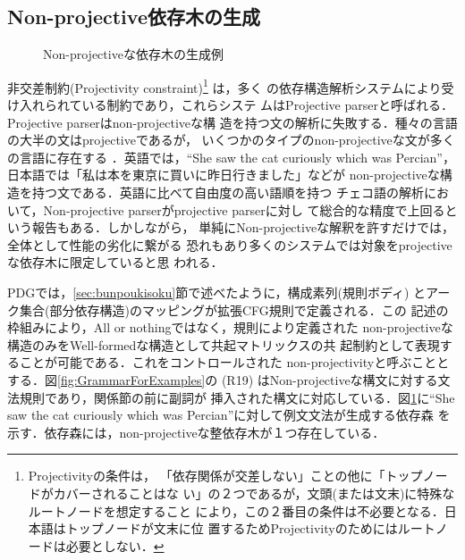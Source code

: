\begin{comment}
   ・アプリケーションにも依存する(弁別の必要がないアプリケーションもある)
  　 大規模な英語文法では，conjoined structureのみにスコープノードで対
　　 応するだけで実用上ほぼ問題なく実現できている．

・このヘッドワード修飾か全体修飾かというスコープの問題は対象言語によっ
　て異なる．
　ロシア語では形容詞の数，名詞の文法的格がsyntacticallyに導入されてい
  る(by agreement and government)
  日本語では発生しない(係り受け文法の制約の存在）

 今後の課題．

\end{comment}

\subsection{Non-projective依存木の生成}

\begin{figure}[b]
 \begin{center}
 \end{center}
\myfiglabelskip
\caption{Non-projectiveな依存木の生成例}
\label{fig:Non-projectiveDT}
\end{figure}

非交差制約(Projectivity constraint)\footnote{Projectivityの条件は，
「依存関係が交差しない」ことの他に「トップノードがカバーされることはな
い」の２つであるが，文頭(または文末)に特殊なルートノードを想定すること
により，この２番目の条件は不必要となる．日本語はトップノードが文末に位
置するためProjectivityのためにはルートノードは必要としない．} は，多く
の依存構造解析システムにより受け入れられている制約であり，これらシステ
ムはProjective parserと呼ばれる．Projective parserはnon-projectiveな構
造を持つ文の解析に失敗する．種々の言語の大半の文はprojectiveであるが，
いくつかのタイプのnon-projectiveな文が多くの言語に存在する
\cite{Meluk88}．英語では，``She saw the cat curiously which was
Percian''，日本語では「私は本を東京に買いに昨日行きました」などが
non-projectiveな構造を持つ文である．英語に比べて自由度の高い語順を持つ
チェコ語の解析において，Non-projective parserがprojective parserに対し
て総合的な精度で上回るという報告もある\cite{McDonald05}．しかしながら，
単純にNon-projectiveな解釈を許すだけでは，全体として性能の劣化に繋がる
恐れもあり多くのシステムでは対象をprojectiveな依存木に限定していると思
われる．

PDGでは，\ref{sec:bunpoukisoku}節で述べたように，構成素列(規則ボディ) 
とアーク集合(部分依存構造)のマッピングが拡張CFG規則で定義される．この
記述の枠組みにより，All or nothingではなく，規則により定義された
non-projectiveな構造のみをWell-formedな構造として共起マトリックスの共
起制約として表現することが可能である．これをコントロールされた
non-projectivityと呼ぶこととする．図\ref{fig:GrammarForExamples}の
(R19) はNon-projectiveな構文に対する文法規則であり，関係節の前に副詞が
挿入された構文に対応している．図\ref{fig:Non-projectiveDT}に``She saw
the cat curiously which was Percian''に対して例文文法が生成する依存森
を示す．依存森には，non-projectiveな整依存木が１つ存在している．


